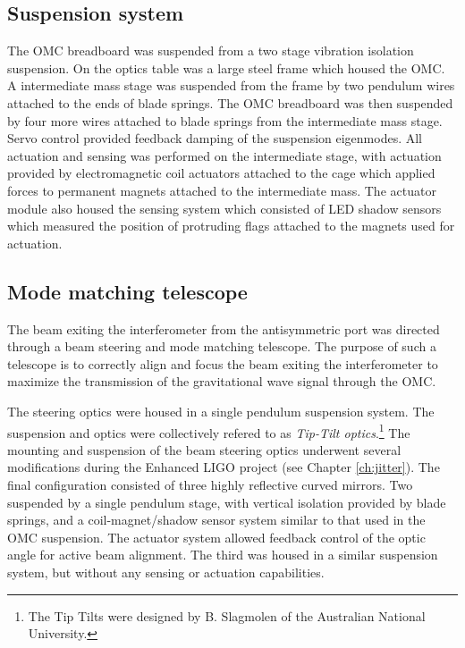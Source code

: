 \subsection{Suspension system}
The OMC breadboard was suspended from a two stage vibration isolation suspension. %
On the optics table was a large steel frame which housed the OMC. %
A intermediate mass stage was suspended from the frame by two pendulum wires attached to the ends of blade springs. %
The OMC breadboard was then suspended by four more wires attached to blade springs from the intermediate mass stage. %
Servo control provided feedback damping of the suspension eigenmodes. %
All actuation and sensing was performed on the intermediate stage, with actuation provided by electromagnetic coil actuators attached to the cage which applied forces to permanent magnets attached to the intermediate mass. %
The actuator module also housed the sensing system which consisted of LED shadow sensors which measured the position of protruding flags attached to the magnets used for actuation.

\subsection{Mode matching telescope}
The beam exiting the interferometer from the antisymmetric port was directed through a beam steering and mode matching telescope. %
The purpose of such a telescope is to correctly align and focus the beam exiting the interferometer to maximize the transmission of the gravitational wave signal through the OMC.

The steering optics were housed in a single pendulum suspension system. %
The suspension and optics were collectively refered to as \emph{Tip-Tilt optics}.\footnote{The Tip Tilts were designed by B. %
Slagmolen of the Australian National University\cite{T0900096}.} The mounting and suspension of the beam steering optics underwent several modifications during the Enhanced LIGO project (see Chapter \ref{ch:jitter}). %
The final configuration consisted of three highly reflective curved mirrors. %
Two suspended by a single pendulum stage, with vertical isolation provided by blade springs, and a coil-magnet/shadow sensor system similar to that used in the OMC suspension. %
The actuator system allowed feedback control of the optic angle for active beam alignment. %
The third was housed in a similar suspension system, but without any sensing or actuation capabilities.

